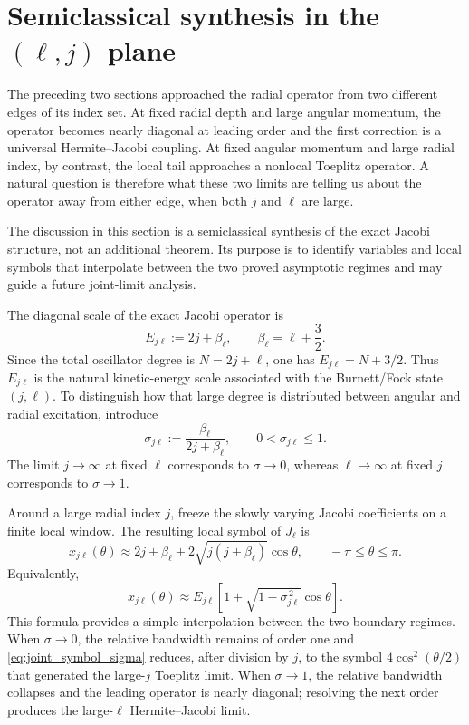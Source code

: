 \documentclass[11pt]{article}
\numberwithin{equation}{section}
\theoremstyle{definition}
\begin{document}
\section{Semiclassical synthesis in the \texorpdfstring{$(\ell,j)$}{(l,j)} plane}
\label{sec:semiclassical_synthesis}

The preceding two sections approached the radial operator from two different
edges of its index set.  At fixed radial depth and large angular momentum, the
operator becomes nearly diagonal at leading order and the first correction is
a universal Hermite--Jacobi coupling.  At fixed angular momentum and large
radial index, by contrast, the local tail approaches a nonlocal Toeplitz
operator.  A natural question is therefore what these two limits are telling
us about the operator away from either edge, when both $j$ and $\ell$ are
large.

The discussion in this section is a semiclassical synthesis of the exact
Jacobi structure, not an additional theorem.  Its purpose is to identify
variables and local symbols that interpolate between the two proved
asymptotic regimes and may guide a future joint-limit analysis.

The diagonal scale of the exact Jacobi operator is
\begin{equation}
 E_{j\ell}:=2j+\beta_\ell,
 \qquad
 \beta_\ell=\ell+\frac32.
 \label{eq:joint_energy_scale}
\end{equation}
Since the total oscillator degree is $N=2j+\ell$, one has
$E_{j\ell}=N+3/2$.  Thus $E_{j\ell}$ is the natural kinetic-energy scale
associated with the Burnett/Fock state $(j,\ell)$.  To distinguish how that
large degree is distributed between angular and radial excitation, introduce
\begin{equation}
 \sigma_{j\ell}
 :=\frac{\beta_\ell}{2j+\beta_\ell},
 \qquad 0<\sigma_{j\ell}\le1.
 \label{eq:sigma_joint}
\end{equation}
The limit $j\to\infty$ at fixed $\ell$ corresponds to $\sigma\to0$, whereas
$\ell\to\infty$ at fixed $j$ corresponds to $\sigma\to1$.

Around a large radial index $j$, freeze the slowly varying Jacobi coefficients
on a finite local window.  The resulting local symbol of $J_\ell$ is
\begin{equation}
 x_{j\ell}(\theta)
 \approx
 2j+\beta_\ell
 +2\sqrt{j(j+\beta_\ell)}\cos\theta,
 \qquad -\pi\le\theta\le\pi.
 \label{eq:joint_jacobi_symbol}
\end{equation}
Equivalently,
\begin{equation}
 \boxed{
 x_{j\ell}(\theta)
 \approx
 E_{j\ell}
 \left[
 1+\sqrt{1-\sigma_{j\ell}^{\,2}}\cos\theta
 \right].
 }
 \label{eq:joint_symbol_sigma}
\end{equation}
This formula provides a simple interpolation between the two boundary
regimes.  When $\sigma\to0$, the relative bandwidth remains of order one and
\eqref{eq:joint_symbol_sigma} reduces, after division by $j$, to the symbol
$4\cos^2(\theta/2)$ that generated the large-$j$ Toeplitz limit.  When
$\sigma\to1$, the relative bandwidth collapses and the leading operator is
nearly diagonal; resolving the next order produces the large-$\ell$
Hermite--Jacobi limit.
\end{document}
